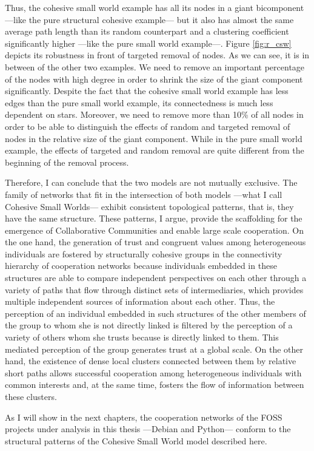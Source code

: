 Thus, the cohesive small world example has all its nodes in a giant bicomponent ---like the pure structural cohesive example--- but it also has almost the same average path length than its random counterpart and a clustering coefficient significantly higher ---like the pure small world example---. Figure \ref{fig:r_csw} depicts its robustness in front of targeted removal of nodes. As we can see, it is in between of the other two examples. We need to remove an important percentage of the nodes with high degree in order to shrink the size of the giant component significantly. Despite the fact that the cohesive small world example has less edges than the pure small world example, its connectedness is much less dependent on stars. Moreover, we need to remove more than 10\% of all nodes in order to be able to distinguish the effects of random and targeted removal of nodes in the relative size of the giant component. While in the pure small world example, the effects of targeted and random removal are quite different from the beginning of the removal process.

Therefore, I can conclude that the two models are not mutually exclusive. The family of networks that fit in the intersection of both models ---what I call Cohesive Small Worlds--- exhibit consistent topological patterns, that is, they have the same structure. These patterns, I argue, provide the scaffolding for the emergence of Collaborative Communities and enable large scale cooperation. On the one hand, the generation of trust and congruent values among heterogeneous individuals are fostered by structurally cohesive groups in the connectivity hierarchy of cooperation networks because individuals embedded in these structures are able to compare independent perspectives on each other through a variety of paths that flow through distinct sets of intermediaries, which provides multiple independent sources of information about each other. Thus, the perception of an individual embedded in such structures of the other members of the group to whom she is not directly linked is filtered by the perception of a variety of others whom she trusts because is directly linked to them. This mediated perception of the group generates trust at a global scale. On the other hand, the existence of dense local clusters connected between them by relative short paths allows successful cooperation among heterogeneous individuals with common interests and, at the same time, fosters the flow of information between these clusters.

As I will show in the next chapters, the cooperation networks of the FOSS projects under analysis in this thesis ---Debian and Python--- conform to the structural patterns of the Cohesive Small World model described here.

